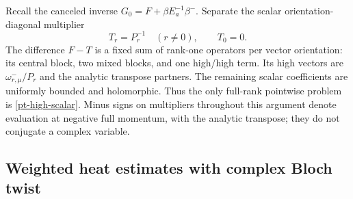 \documentclass[11pt]{article}
\theoremstyle{remark}
\begin{document}
Recall the canceled inverse $G_0=F+\beta E_a^{-1}\beta^-$.
Separate the scalar orientation-diagonal multiplier
\begin{equation}\label{pt-high-scalar}
 T_r=P_r^{-1}\quad(r\ne0),\qquad T_0=0.
\end{equation}
The difference $F-T$ is a fixed sum of rank-one operators per vector
orientation: its central block, two mixed blocks, and one high/high
term. Its high vectors are $\omega_{r,\mu}^-/P_r$ and the analytic
transpose partners. The remaining scalar coefficients are uniformly
bounded and holomorphic. Thus the only full-rank pointwise problem is
\eqref{pt-high-scalar}. Minus signs on multipliers throughout this
argument denote evaluation at negative full momentum, with the
analytic transpose; they do not conjugate a complex variable.

\subsection{Weighted heat estimates with complex Bloch twist}
\end{document}
